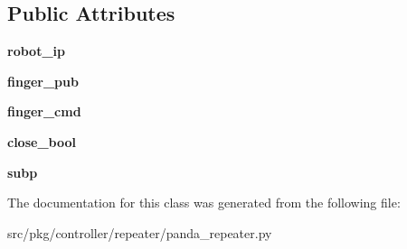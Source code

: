 \subsection*{Public Attributes}
\begin{DoxyCompactItemize}
\item 
\mbox{\label{classrnb-planning_1_1src_1_1pkg_1_1controller_1_1repeater_1_1panda__repeater_1_1_panda_repeater_ac49c74da60e666b782cf3d1918a774e7}} 
{\bfseries robot\+\_\+ip}
\item 
\mbox{\label{classrnb-planning_1_1src_1_1pkg_1_1controller_1_1repeater_1_1panda__repeater_1_1_panda_repeater_a2c0560c136ebb6c0b1b3889ae8b75558}} 
{\bfseries finger\+\_\+pub}
\item 
\mbox{\label{classrnb-planning_1_1src_1_1pkg_1_1controller_1_1repeater_1_1panda__repeater_1_1_panda_repeater_acd5df1a3f05474e40fcf135c9eda4e06}} 
{\bfseries finger\+\_\+cmd}
\item 
\mbox{\label{classrnb-planning_1_1src_1_1pkg_1_1controller_1_1repeater_1_1panda__repeater_1_1_panda_repeater_a873f8cdd308c82ce868bc0af87e886ae}} 
{\bfseries close\+\_\+bool}
\item 
\mbox{\label{classrnb-planning_1_1src_1_1pkg_1_1controller_1_1repeater_1_1panda__repeater_1_1_panda_repeater_acbc74f379e157da0f15d179478d3fcee}} 
{\bfseries subp}
\end{DoxyCompactItemize}


The documentation for this class was generated from the following file\+:\begin{DoxyCompactItemize}
\item 
src/pkg/controller/repeater/panda\+\_\+repeater.\+py\end{DoxyCompactItemize}
